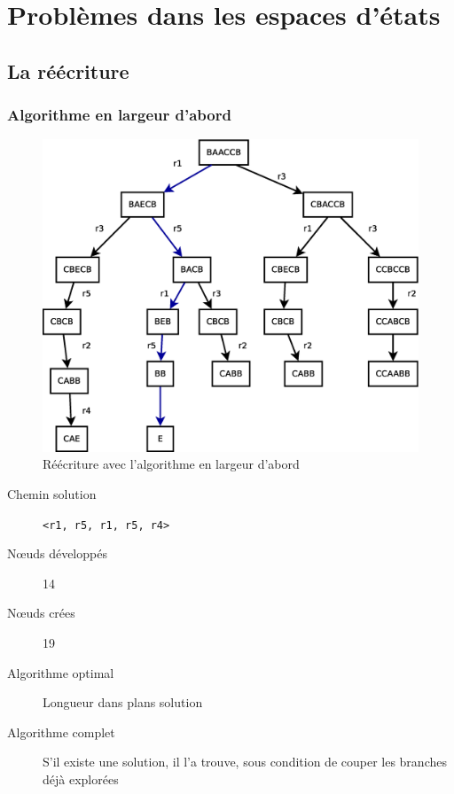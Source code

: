 \documentclass[12pt,a4paper,openany]{book}
\begin{document}
	\thispagestyle{empty} %
	\titleBC 
	\setcounter{tocdepth}{2}
	\setcounter{secnumdepth}{3}
	\tableofcontents
	\chapter{Problèmes dans les espaces d'états}
	\section{La réécriture}
	\subsection{Algorithme en largeur d'abord}
	\begin{figure}[H]
		\centering
		\includegraphics[width=15cm]{Diagramme1.eps}
		\caption{Réécriture avec l'algorithme en largeur d'abord}
	\end{figure}
	\begin{description}
		\item[Chemin solution] \texttt{<r1, r5, r1, r5, r4>}
		\item[Nœuds développés] 14
		\item[Nœuds crées] 19
		\item[Algorithme optimal] Longueur dans plans solution 
		\item[Algorithme complet] S'il existe une solution, il l'a trouve, sous condition de couper les branches déjà explorées
	\end{description}
\end{document}
